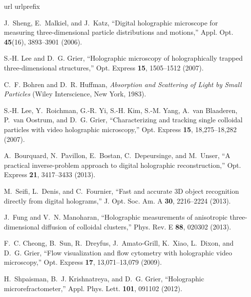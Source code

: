 \documentclass[10pt,letterpaper]{article}
\begin{document}
%
%
\begin{thebibliography}{10}
\newcommand{\enquote}[1]{``#1''}
\expandafter\ifx\csname url\endcsname\relax
  \def\url#1{\texttt{#1}}\fi
\expandafter\ifx\csname urlprefix\endcsname\relax\def\urlprefix{URL }\fi
\providecommand{\eprint}[2][]{\url{#2}}

J.~Sheng, E.~Malkiel, and J.~Katz, \enquote{Digital holographic microscope for
  measuring three-dimensional particle distributions and motions,} Appl. Opt.
  \textbf{45}(16), 3893--3901 (2006).

S.-H. Lee and D.~G. Grier, \enquote{Holographic microscopy of holographically
  trapped three-dimensional structures,} Opt. Express \textbf{15}, 1505--1512
  (2007).

C.~F. Bohren and D.~R. Huffman, \emph{Absorption and Scattering of Light by
  Small Particles} (Wiley Interscience, New York, 1983).

S.-H. Lee, Y.~Roichman, G.-R. Yi, S.-H. Kim, S.-M. Yang, A.~van Blaaderen,
  P.~van Oostrum, and D.~G. Grier, \enquote{Characterizing and tracking single
  colloidal particles with video holographic microscopy,} Opt. Express
  \textbf{15}, 18,275--18,282 (2007).

A.~Bourquard, N.~Pavillon, E.~Bostan, C.~Depeursinge, and M.~Unser, \enquote{A
  practical inverse-problem approach to digital holographic reconstruction,}
  Opt. Express \textbf{21}, 3417--3433 (2013).

M.~Seifi, L.~Denis, and C.~Fournier, \enquote{Fast and accurate 3D object
  recognition directly from digital holograms,} J. Opt. Soc. Am. A \textbf{30},
  2216--2224 (2013).

J.~Fung and V.~N. Manoharan, \enquote{Holographic measurements of anisotropic
  three-dimensional diffusion of colloidal clusters,} Phys. Rev. E \textbf{88},
  020302 (2013).

F.~C. Cheong, B.~Sun, R.~Dreyfus, J.~Amato-Grill, K.~Xiao, L.~Dixon, and D.~G.
  Grier, \enquote{Flow visualization and flow cytometry with holographic video
  microscopy,} Opt. Express \textbf{17}, 13,071--13,079 (2009).

H.~Shpaisman, B.~J. Krishnatreya, and D.~G. Grier, \enquote{Holographic
  microrefractometer,} Appl. Phys. Lett. \textbf{101}, 091102 (2012).


\end{thebibliography}
\end{document}
